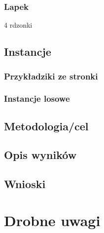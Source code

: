 \documentclass{article}
\begin{document}
\subsubsection{Lapek}
4 rdzonki

\subsection{Instancje}
\subsubsection{Przykładziki ze stronki}

\subsubsection{Instancje losowe}

\subsection{Metodologia/cel}

\subsection{Opis wyników}

\subsection{Wnioski}

\section*{Drobne uwagi}
\end{document}
